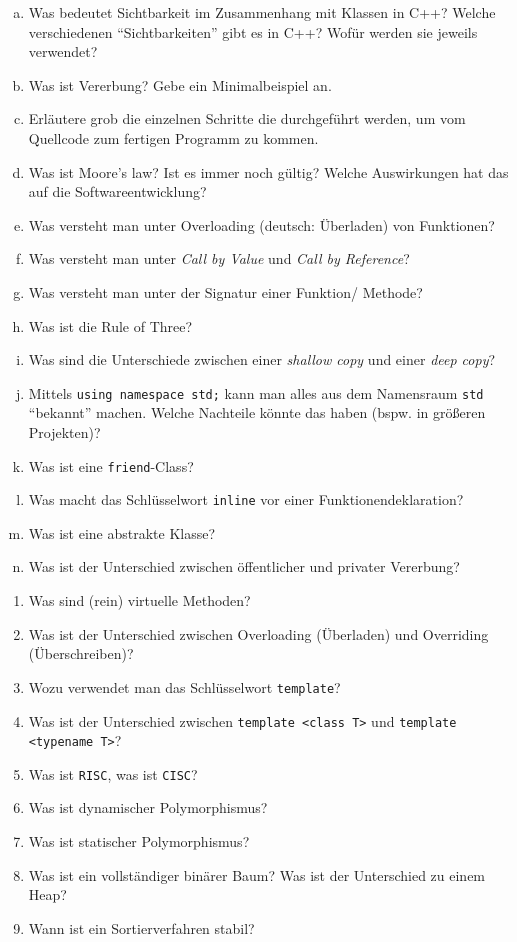 \documentclass[a4paper,12pt,parskip=full]{scrartcl}
\begin{document}
\begin{enumerate}[a)]
\item Was bedeutet Sichtbarkeit im Zusammenhang mit Klassen in C++?
  Welche verschiedenen ``Sichtbarkeiten'' gibt es in C++? Wofür werden
  sie jeweils verwendet?
\item Was ist Vererbung? Gebe ein Minimalbeispiel an.
\item Erläutere grob die einzelnen Schritte die durchgeführt werden,
  um vom Quellcode zum fertigen Programm zu kommen.
\item Was ist Moore's law? Ist es immer noch gültig? Welche
  Auswirkungen hat das auf die Softwareentwicklung?
\item Was versteht man unter Overloading (deutsch: Überladen) von
  Funktionen?
\item Was versteht man unter \emph{Call by Value} und \emph{Call by
    Reference}?
\item Was versteht man unter der Signatur einer Funktion/ Methode?
\item Was ist die Rule of Three?
\item Was sind die Unterschiede zwischen einer \emph{shallow copy} und
  einer \emph{deep copy}?
\item Mittels \lstinline{using namespace std;} kann man alles aus dem
  Namensraum \lstinline{std} ``bekannt'' machen. Welche Nachteile
  könnte das haben (bspw. in größeren Projekten)?
\item Was ist eine \lstinline{friend}-Class?
\item Was macht das Schlüsselwort \lstinline{inline} vor einer
  Funktionendeklaration?
\item Was ist eine abstrakte Klasse?
\item Was ist der Unterschied zwischen öffentlicher und privater
  Vererbung?
\end{enumerate}
\begin{enumerate}[aa)]
\item Was sind (rein) virtuelle Methoden?
\item Was ist der Unterschied zwischen Overloading (Überladen) und
  Overriding (Überschreiben)?
\item Wozu verwendet man das Schlüsselwort \lstinline{template}?
\item Was ist der Unterschied zwischen \lstinline{template <class T>}
  und \lstinline{template <typename T>}?
\item Was ist \texttt{RISC}, was ist \texttt{CISC}?
\item Was ist dynamischer Polymorphismus?
\item Was ist statischer Polymorphismus?
\item Was ist ein vollständiger binärer Baum? Was ist der Unterschied
  zu einem Heap?
\item Wann ist ein Sortierverfahren stabil?
\end{enumerate}
\end{document}
